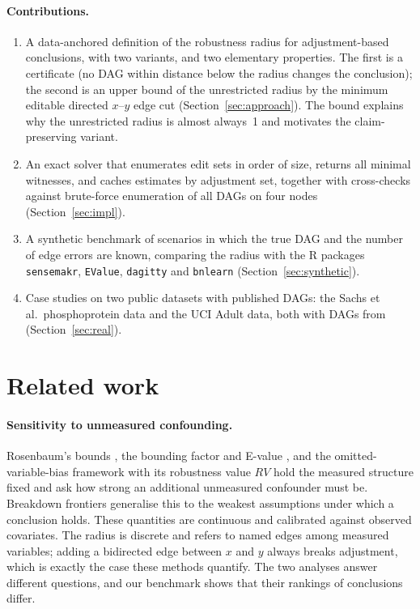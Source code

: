 \documentclass[11pt]{article}
\begin{document}
\paragraph{Contributions.}
\begin{enumerate}[leftmargin=*,itemsep=2pt]
\item A data-anchored definition of the robustness radius for adjustment-based conclusions, with two variants, and two elementary properties. The first is a certificate (no DAG within distance below the radius changes the conclusion); the second is an upper bound of the unrestricted radius by the minimum editable directed $x$--$y$ edge cut (Section~\ref{sec:approach}). The bound explains why the unrestricted radius is almost always~1 and motivates the claim-preserving variant.
\item An exact solver that enumerates edit sets in order of size, returns all minimal witnesses, and caches estimates by adjustment set, together with cross-checks against brute-force enumeration of all DAGs on four nodes (Section~\ref{sec:impl}).
\item A synthetic benchmark of \BN{} scenarios in which the true DAG and the number of edge errors are known, comparing the radius with the R packages \texttt{sensemakr}, \texttt{EValue}, \texttt{dagitty} and \texttt{bnlearn} (Section~\ref{sec:synthetic}).
\item Case studies on two public datasets with published DAGs: the Sachs et al.\ phosphoprotein data and the UCI Adult data, both with DAGs from \citet{ankan2021} (Section~\ref{sec:real}).
\end{enumerate}

\section{Related work}

\paragraph{Sensitivity to unmeasured confounding.} Rosenbaum's bounds \citep{rosenbaum2002}, the bounding factor and E-value \citep{ding2016,vanderweele2017,mathur2018}, and the omitted-variable-bias framework with its robustness value $RV$ \citep{cinelli2020} hold the measured structure fixed and ask how strong an additional unmeasured confounder must be. Breakdown frontiers \citep{masten2020} generalise this to the weakest assumptions under which a conclusion holds. These quantities are continuous and calibrated against observed covariates. The radius is discrete and refers to named edges among measured variables; adding a bidirected edge between $x$ and $y$ always breaks adjustment, which is exactly the case these methods quantify. The two analyses answer different questions, and our benchmark shows that their rankings of conclusions differ.
\end{document}

